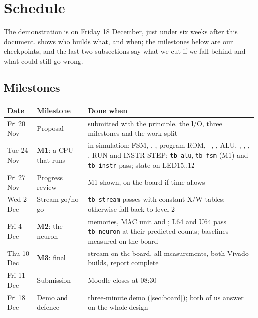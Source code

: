 \section{Schedule}\label{sec:schedule}

The demonstration is on Friday 18 December, just under six weeks after this document.  shows who builds what, and when; the milestones below are our checkpoints, and the last two subsections say what we cut if we fall behind and what could still go wrong.


\subsection{Milestones}

\begin{center}\small
\begin{tabularx}{\linewidth}{@{}l l L@{}}
\toprule
Date & Milestone & Done when \\
\midrule
Fri 20 Nov & Proposal & submitted with the principle, the I/O, three milestones and the work split \\
Tue 24 Nov & \textbf{M1}: a CPU that runs & in simulation: FSM, , , program ROM, --, , ALU, , , , , RUN and INSTR-STEP; \texttt{tb\_alu}, \texttt{tb\_fsm} (M1) and \texttt{tb\_instr} pass; state on LED15..12 \\
Fri 27 Nov & Progress review & M1 shown, on the board if time allows \\
Wed 2 Dec & Stream go/no-go & \texttt{tb\_stream} passes with constant X/W tables; otherwise fall back to level 2 \\
Fri 4 Dec & \textbf{M2}: the neuron & memories, MAC unit and ; L64 and U64 pass \texttt{tb\_neuron} at their predicted counts; baselines measured on the board \\
Thu 10 Dec & \textbf{M3}: final & stream on the board, all measurements, both Vivado builds, report complete \\
Fri 11 Dec & Submission & Moodle closes at 08:30 \\
Fri 18 Dec & Demo and defence & three-minute demo (\cref{sec:board}); both of us answer on the whole design \\
\bottomrule
\end{tabularx}
\end{center}

